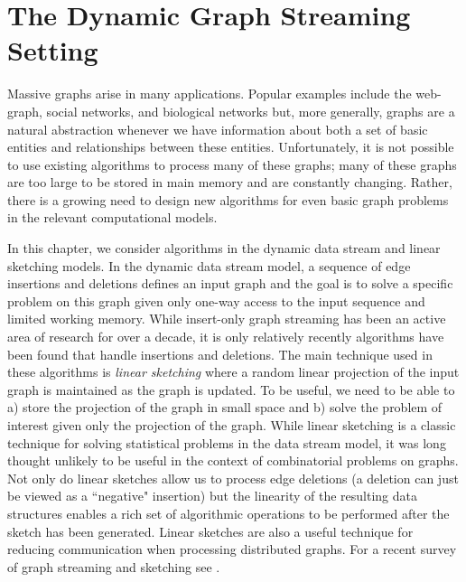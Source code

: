 


\section{The Dynamic Graph Streaming Setting}

Massive graphs arise in many applications. Popular examples include the web-graph, social networks, and biological networks but, more generally, graphs are a natural abstraction whenever we have information about both a set of basic entities and relationships between these entities. Unfortunately, it is not possible to use existing algorithms to process many of these graphs; many of these graphs are too large to be stored in main memory and are constantly changing. Rather, there is a growing need to design new algorithms for even basic graph problems in the relevant computational models. 

In this chapter, we consider algorithms in the dynamic data stream and linear sketching models. In the dynamic data stream model, a sequence of edge insertions and deletions defines an input graph and the goal is to solve a specific problem on this graph given only one-way access to the input sequence and limited working memory. While insert-only graph streaming has been an active area of research for over a decade, it is only relatively recently algorithms have been found that handle insertions and deletions\cite{AhnGM12a,AhnGM12b,AhnGM13,KapralovLMMS14,KapralovW14,GoelKP12,KutzkovP14a}. The main technique used in these algorithms is \emph{linear sketching} where a random linear projection of the input graph is maintained as the graph is updated. To be useful, we need to be able to a) store the projection of the graph in small space and b) solve the problem of interest given only the projection of the graph. While linear sketching is a classic technique for solving statistical problems in the data stream model, it was long thought unlikely to be useful in the context of combinatorial problems on graphs. Not only do linear sketches allow us to process edge deletions (a deletion can just be viewed as a ``negative" insertion) but the linearity of the resulting data structures enables a rich set of algorithmic operations to be performed after the sketch has been generated. Linear sketches are also a useful technique for reducing communication when processing distributed graphs. For a recent survey of graph streaming and sketching  see  \cite{McGregor14}.
 

